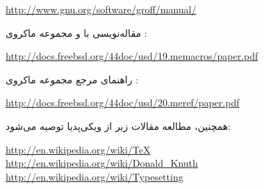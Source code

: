 \begin{latin}
\url{http://www.gnu.org/software/groff/manual/}
\end{latin}

مقاله‌نویسی با  و مجموعه ماکروی :

\begin{latin}
\url{http://docs.freebsd.org/44doc/usd/19.memacros/paper.pdf}
\end{latin}

راهنمای مرجع مجموعه ماکروی :

\begin{latin}
\url{http://docs.freebsd.org/44doc/usd/20.meref/paper.pdf}
\end{latin}

همچنین، مطالعه مقالات زیر از ویکی‌پدیا توصیه می‌شود:

\begin{latin}
\url{http://en.wikipedia.org/wiki/TeX}\\
\url{http://en.wikipedia.org/wiki/Donald_Knuth}\\
\url{http://en.wikipedia.org/wiki/Typesetting}
\end{latin}